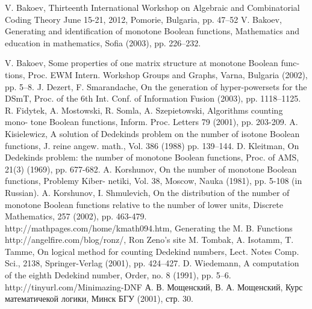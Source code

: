 

\begin{thebibliography}{9}
V. Bakoev, Thirteenth International Workshop on Algebraic and Combinatorial Coding Theory
June 15-21, 2012, Pomorie, Bulgaria, pp. 47--52
V. Bakoev, Generating and identification 
	of monotone Boolean functions, Mathematics 
	and education in mathematics, 
	Sofia (2003), pp. 226--232.
	
 V. Bakoev, Some properties of one matrix structure at monotone Boolean func-
tions, Proc. EWM Intern. Workshop Groups and Graphs, Varna, Bulgaria (2002),
pp. 5--8.
 J. Dezert, F. Smarandache, On the generation of hyper-powersets for the DSmT,
Proc. of the 6th Int. Conf. of Information Fusion (2003), pp. 1118--1125.
 R. Fidytek, A. Mostowski, R. Somla, A. Szepietowski, Algorithms counting mono-
tone Boolean functions, Inform. Proc. Letters 79 (2001), pp. 203-209.
 A. Kisielewicz, A solution of Dedekinds problem on the number of isotone Boolean
functions, J. reine angew. math., Vol. 386 (1988) pp. 139--144.
 D. Kleitman, On Dedekinds problem: the number of monotone Boolean functions,
Proc. of AMS, 21(3) (1969), pp. 677-682.
 A. Korshunov, On the number of monotone Boolean functions, Problemy Kiber-
netiki, Vol. 38, Moscow, Nauka (1981), pp. 5-108 (in Russian).
 A. Korshunov, I. Shmulevich, On the distribution of the number of monotone
Boolean functions relative to the number of lower units, Discrete Mathematics,
257 (2002), pp. 463-479.
 http://mathpages.com/home/kmath094.htm, Generating the M. B. Functions
 http://angelfire.com/blog/ronz/, Ron Zeno's site
 M. Tombak, A. Isotamm, T. Tamme, On logical method for counting Dedekind
numbers, Lect. Notes Comp. Sci., 2138, Springer-Verlag (2001), pp. 424--427.
 D. Wiedemann, A computation of the eighth Dedekind number, Order, no. 8
(1991), pp. 5--6.
 http://tinyurl.com/Minimazing-DNF
 А. В. Мощенский, В. А. Мощенский, Курс математичекой логики, Минск БГУ (2001),
стр. 30.
\end{thebibliography}

